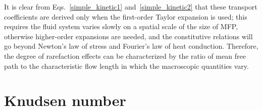 
It is clear from Eqs.~\eqref{simple_kinetic1} and~\eqref{simple_kinetic2} that these transport coefficients are derived only when the first-order Taylor expansion is used; this requires the fluid system varies slowly on a spatial scale of the size of MFP, otherwise higher-order expansions are needed, and the constitutive relations will go beyond Newton's law of stress and  Fourier's law of heat conduction. Therefore, the degree of rarefaction effects can be characterized by the ratio of mean free path to the characteristic flow length in which the macroscopic quantities vary.  


%

\section{Knudsen number}

